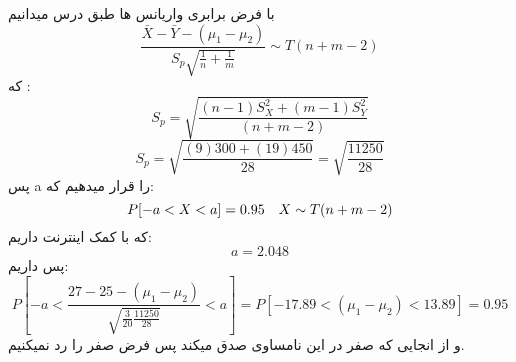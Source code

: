 \problem{}
با فرض برابری واریانس ها طبق درس میدانیم
\[ \frac{\bar{X}-\bar{Y}-(\mu_1-\mu_2)}{S_p\sqrt{\frac{1}{n}+\frac{1}{m}}} \sim T(n+m-2) \]
که :\\
\[ S_p = \sqrt{\frac{(n-1)S_X^2+(m-1)S_Y^2}{(n+m-2)}}\]
\[ S_p = \sqrt{\frac{(9)300+(19)450}{28}} = \sqrt{\frac{11250}{28}}\]
پس a را قرار میدهیم که:\\
\[ P[-a<X<a] = 0.95 \text{\quad} X\sim T(n+m-2) \]
که با کمک اینترنت داریم:\\
\[ a = 2.048\]
پس داریم:\\
\[ P[-a<\frac{27-25-(\mu_1-\mu_2)}{\sqrt{\frac{3}{20}\frac{11250}{28}}}<a ]
=  P[-17.89 < (\mu_1-\mu_2) < 13.89] = 0.95  \]
و از انجایی که صفر در این نامساوی صدق میکند پس فرض صفر را رد نمیکنیم.